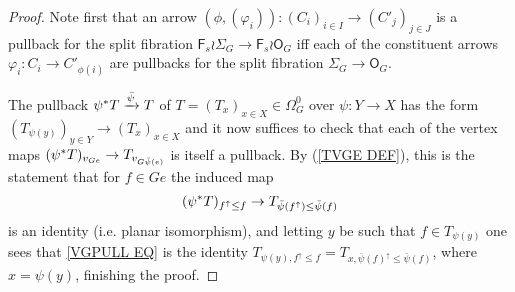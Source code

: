 \documentclass[a4paper,10pt
,draft
]{article}%
\numberwithin{equation}{section}
\numberwithin{figure}{section}
\theoremstyle{definition} %
\newcommand{\Fin}{\mathsf{F}}%
\newcommand{\1}{\ensuremath{\mathbbm 1}}%
\begin{document}
\begin{proof}
Note first that an arrow 
$(\phi,(\varphi_i))\colon (C_i)_{i \in I} \to (C'_j)_{j\in J}$
is a pullback for the split fibration 
$\Fin_s \wr \Sigma_G \to \Fin_s \wr \mathsf{O}_G$
iff each of the constituent arrows
$\varphi_i \colon C_i \to C'_{\phi(i)}$
are pullbacks for the split fibration $\Sigma_G \to \mathsf{O}_G$.

The pullback
$\psi^{\**} T \xrightarrow{\bar{\psi}} T$
of $T = (T_x)_{x \in X} \in \Omega_{G}^{0}$
over $\psi \colon Y \to X$
has the form 
$(T_{\psi(y)})_{y \in Y} \to (T_x)_{x \in X}$
and it now suffices to check that each of the vertex maps
$
	(\psi^{\**} T)_{v_{G e}} \to T_{v_{G \bar{\psi}(e)}}
$
is itself a pullback.
By (\ref{TVGE DEF}), this is the statement that for 
$f \in G e$ the induced map
\begin{equation}\label{VGPULL EQ}
	(\psi^{\**}T)_{f^{\uparrow} \leq f} \to 
	T_{\bar{\psi}(f^{\uparrow}) \leq \bar{\psi} (f)}
\end{equation}
is an identity (i.e. planar isomorphism),
and letting $y$ be such that $f \in T_{\psi(y)}$
one sees that \eqref{VGPULL EQ}
is the identity
$T_{\psi(y),f^{\uparrow} \leq f} = 
T_{x,\bar{\psi}(f)^{\uparrow} \leq \bar{\psi}(f)}$, where $x=\psi(y)$, finishing the proof.
\end{proof}
\end{document}
